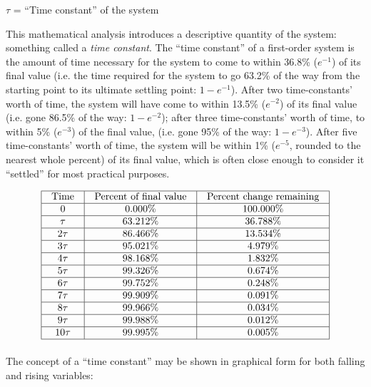 
$\tau$ = ``Time constant'' of the system

\vskip 10pt

\filbreak

This mathematical analysis introduces a descriptive quantity of the system: something called a \textit{time constant}.  The ``time constant'' of a first-order system is the amount of time necessary for the system to come to within 36.8\% ($e^{-1}$) of its final value (i.e. the time required for the system to go 63.2\% of the way from the starting point to its ultimate settling point: $1 - e^{-1}$).  After two time-constants' worth of time, the system will have come to within 13.5\% ($e^{-2}$) of its final value (i.e. gone 86.5\% of the way: $1 - e^{-2}$); after three time-constants' worth of time, to within 5\% ($e^{-3}$) of the final value, (i.e. gone 95\% of the way: $1 - e^{-3}$).  After five time-constants' worth of time, the system will be within 1\% ($e^{-5}$, rounded to the nearest whole percent) of its final value, which is often close enough to consider it ``settled'' for most practical purposes.  


$$\vbox{\offinterlineskip
\halign{\strut
\vrule \quad\hfil # \ \hfil & 
\vrule \quad\hfil # \ \hfil & 
\vrule \quad\hfil # \ \hfil \vrule \cr
\noalign{\hrule}
%
Time & Percent of final value & Percent change remaining \cr
%
\noalign{\hrule}
%
0 & 0.000\% & 100.000\% \cr
%
\noalign{\hrule}
%
$\tau$ & 63.212\% & 36.788\% \cr
%
\noalign{\hrule}
%
$2\tau$ & 86.466\% & 13.534\% \cr
%
\noalign{\hrule}
%
3$\tau$ & 95.021\% & 4.979\% \cr
%
\noalign{\hrule}
%
4$\tau$ & 98.168\% & 1.832\% \cr
%
\noalign{\hrule}
%
5$\tau$ & 99.326\% & 0.674\% \cr
%
\noalign{\hrule}
%
6$\tau$ & 99.752\% & 0.248\% \cr
%
\noalign{\hrule}
%
7$\tau$ & 99.909\% & 0.091\% \cr
%
\noalign{\hrule}
%
8$\tau$ & 99.966\% & 0.034\% \cr
%
\noalign{\hrule}
%
9$\tau$ & 99.988\% & 0.012\% \cr
%
\noalign{\hrule}
%
10$\tau$ & 99.995\% & 0.005\% \cr
%
\noalign{\hrule}
} %
}$$ %

\filbreak

The concept of a ``time constant'' may be shown in graphical form for both falling and rising variables:

